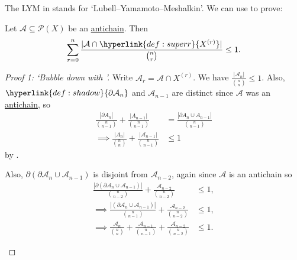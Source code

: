 \documentclass{article}
\let\subset\subseteq
\begin{document}
The LYM in  stands for `Lubell–Yamamoto–Meshalkin'.
We can use  to prove:
\begin{nthm}[LYM]\label{thm:lym}
  Let $\mathcal{A} \subset \mathcal{P}(X)$ be an \hyperlink{def:antichain}{antichain}.
  Then
  \begin{equation*}
    \sum_{r=0}^n \frac{|\mathcal{A} \cap \hyperlink{def:superr}{X^{(r)}}|}{\binom{n}{r}} \leq 1.
  \end{equation*}
\end{nthm}
\begin{proof}[Proof 1: `Bubble down with ']
  Write $\mathcal{A}_r = \mathcal{A} \cap X^{(r)}$.
  We have $\frac{|\mathcal{A}_n|}{\binom{n}{n}} \leq 1$.
  Also, $\hyperlink{def:shadow}{\partial \mathcal{A}_n}$ and $\mathcal{A}_{n-1}$ are distinct since $\mathcal{A}$ was an \hyperlink{def:antichain}{antichain}, so
  \begin{align*}
    \frac{|\partial A_n|}{\binom{n}{n-1}} + \frac{|A_{n-1}|}{\binom{n}{n-1}} &= \frac{|\partial A_n \cup A_{n-1}|}{\binom{n}{n-1}} \\
    \implies \frac{|A_n|}{\binom{n}{n}} + \frac{|\mathcal{A}_{n-1}|}{\binom{n}{n-1}} &\leq 1
  \end{align*}
  by .

  Also, $\partial(\partial \mathcal{A}_n \cup \mathcal{A}_{n-1})$ is disjoint from $\mathcal{A}_{n-2}$, again since $\mathcal{A}$ is an antichain so
  \begin{align*}
    \frac{|\partial(\partial \mathcal{A}_n \cup \mathcal{A}_{n-1})|}{\binom{n}{n-2}} + \frac{\mathcal{A}_{n-2}}{{n \choose n-2}} &\leq 1, \\
    \implies \frac{|(\partial \mathcal{A}_n \cup \mathcal{A}_{n-1})|}{\binom{n}{n-1}} + \frac{\mathcal{A}_{n-2}}{{n \choose n-2}} &\leq 1, \\
    \implies \frac{\mathcal{A}_n}{\binom{n}{n}} + \frac{\mathcal{A}_{n-1}}{\binom{n}{n-1}} + \frac{\mathcal{A}_{n-2}}{\binom{n}{n-2}} &\leq 1.
  \end{align*}
  \begin{center}
\end{center}
\end{proof}
\end{document}
